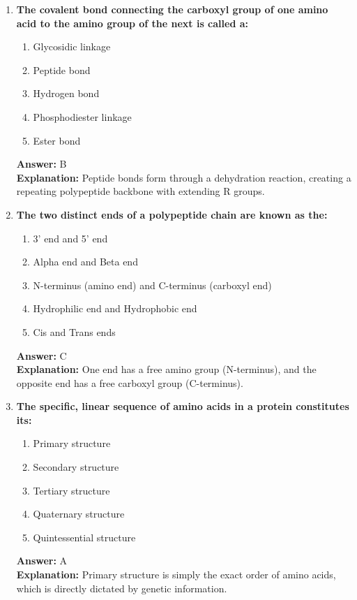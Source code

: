 \documentclass[11pt, a4paper]{article}
\begin{document}
\begin{enumerate}
\item \textbf{The covalent bond connecting the carboxyl group of one amino acid to the amino group of the next is called a:}
\begin{enumerate}[label=\Alph*.]
    \item Glycosidic linkage
    \item Peptide bond
    \item Hydrogen bond
    \item Phosphodiester linkage
    \item Ester bond
\end{enumerate}
\textbf{Answer:} B \\
\textbf{Explanation:} Peptide bonds form through a dehydration reaction, creating a repeating polypeptide backbone with extending R groups.

\item \textbf{The two distinct ends of a polypeptide chain are known as the:}
\begin{enumerate}[label=\Alph*.]
    \item 3' end and 5' end
    \item Alpha end and Beta end
    \item N-terminus (amino end) and C-terminus (carboxyl end)
    \item Hydrophilic end and Hydrophobic end
    \item Cis and Trans ends
\end{enumerate}
\textbf{Answer:} C \\
\textbf{Explanation:} One end has a free amino group (N-terminus), and the opposite end has a free carboxyl group (C-terminus).

\item \textbf{The specific, linear sequence of amino acids in a protein constitutes its:}
\begin{enumerate}[label=\Alph*.]
    \item Primary structure
    \item Secondary structure
    \item Tertiary structure
    \item Quaternary structure
    \item Quintessential structure
\end{enumerate}
\textbf{Answer:} A \\
\textbf{Explanation:} Primary structure is simply the exact order of amino acids, which is directly dictated by genetic information.


\end{enumerate}
\end{document}

